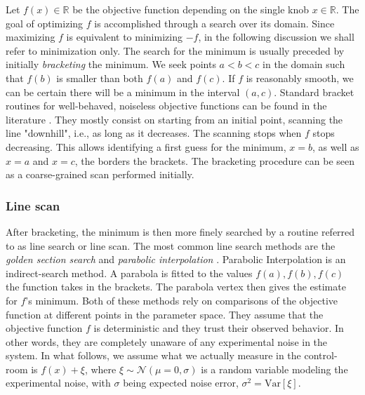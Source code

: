 Let $f(x)\in\mathbb{R}$ be the objective function depending on the single knob $x\in\mathbb{R}$. The goal of optimizing $f$ is accomplished through a search over its domain. Since maximizing $f$ is equivalent to minimizing $-f$, in the following discussion we shall refer to minimization only. The search for the minimum is usually preceded by initially \textit{bracketing} the minimum. We seek points $a < b < c$ in the domain such that $f(b)$ is smaller than both $f(a)$ and $f(c)$. If $f$ is reasonably smooth, we can be certain there will be a minimum in the interval $(a, c)$. Standard bracket routines for well-behaved, noiseless objective functions can be found in the literature \cite[section 10.1]{press_numerical_2007}. They mostly consist on starting from an initial point, scanning the line "downhill", i.e., as long as it decreases. The scanning stops when $f$ stops decreasing. This allows identifying a first guess for the minimum, $x=b$, as well as $x=a$ and $x=c$, the borders the brackets. The bracketing procedure can be seen as a coarse-grained scan performed initially.

\subsubsection{Line scan}
After bracketing, the minimum is then more finely searched by a routine referred to as line search or line scan. The most common line search methods are the \textit{golden section search} and \textit{parabolic interpolation} \cite[sections 10.2 and 10.3]{press_numerical_2007}. Parabolic Interpolation is an indirect-search method. A parabola is fitted to the values $f(a), f(b), f(c)$ the function takes in the brackets. The parabola vertex then gives the estimate for $f$'s minimum.
Both of these methods rely on comparisons of the objective function at different points in the parameter space. They assume that the objective function $f$ is deterministic and they trust their observed behavior. In other words, they are completely unaware of any experimental noise in the system. In what follows, we assume what we actually measure in the control-room is $f(x) + \xi$, where $\xi\sim\mathcal{N}(\mu=0, \sigma)$ is a random variable modeling the experimental noise, with $\sigma$ being expected noise error, $\sigma^2 = \text{Var}[\xi]$.

